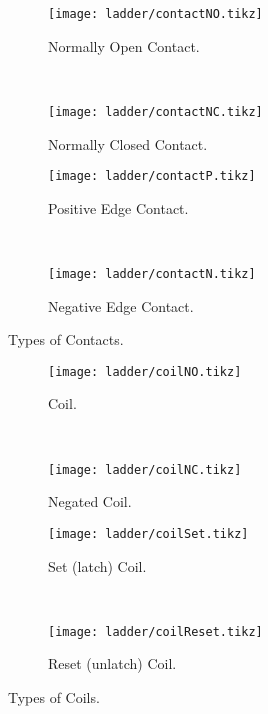 \newlength{\ladderskip}
\newlength{\ladderrungsep}

\begin{figure}[H]
\begin{subfigure}[t]{0.45\textwidth}
  \centering \texttt{[image: ladder/contactNO.tikz]}
  \caption{Normally Open Contact.}
  \label{fig:contactNO}
\end{subfigure}
~
\begin{subfigure}[t]{0.45\textwidth}
  \centering \texttt{[image: ladder/contactNC.tikz]}
  \caption{Normally Closed Contact.}
  \label{fig:contactNC}
\end{subfigure}
\vspace{1em}

\begin{subfigure}[t]{0.45\textwidth}
  \centering \texttt{[image: ladder/contactP.tikz]}
  \caption{Positive Edge Contact.}
  \label{fig:contactP}
\end{subfigure}
~
\begin{subfigure}[t]{0.45\textwidth}
  \centering \texttt{[image: ladder/contactN.tikz]}
  \caption{Negative Edge Contact.}
  \label{fig:contactN}
\end{subfigure}

  \caption{Types of Contacts.}
  \label{fig:contacts}
\end{figure}

\begin{figure}[H]
\begin{subfigure}[t]{0.45\textwidth}
  \centering \texttt{[image: ladder/coilNO.tikz]}
  \caption{Coil.}
  \label{fig:contactNO}
\end{subfigure}
~
\begin{subfigure}[t]{0.45\textwidth}
  \centering \texttt{[image: ladder/coilNC.tikz]}
  \caption{Negated Coil.}
  \label{fig:contactNC}
\end{subfigure}
\vspace{1em}

\begin{subfigure}[t]{0.45\textwidth}
  \centering \texttt{[image: ladder/coilSet.tikz]}
  \caption{Set (latch) Coil.}
  \label{fig:contactP}
\end{subfigure}
~
\begin{subfigure}[t]{0.45\textwidth}
  \centering \texttt{[image: ladder/coilReset.tikz]}
  \caption{Reset (unlatch) Coil.}
  \label{fig:contactN}
\end{subfigure}

  \caption{Types of Coils.}
  \label{fig:coils}
\end{figure}

